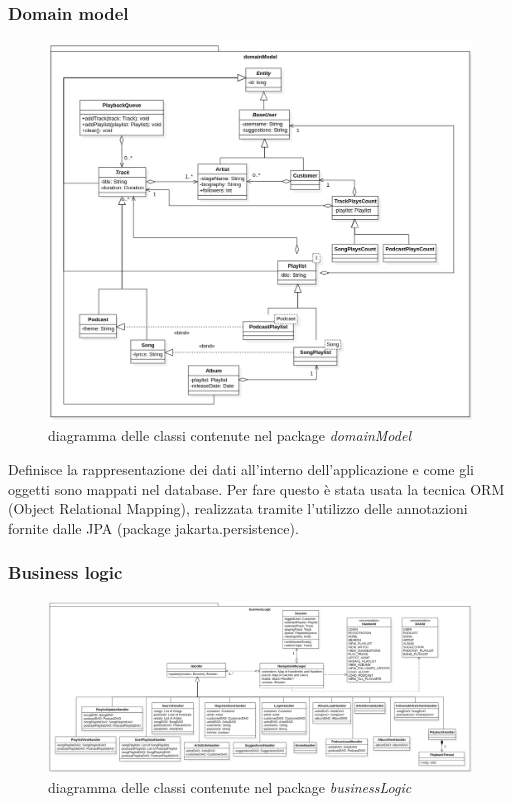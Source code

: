 \documentclass{article}
\begin{document}
  \subsubsection{Domain model}
  \begin{figure}[H]
    \centering
    \includegraphics[width=0.9\linewidth]{domainModel.png}
    \caption{diagramma delle classi contenute nel package \textit{domainModel}}
    \label{fig:domainModel}
  \end{figure}

  Definisce la rappresentazione dei dati all'interno dell'applicazione e come gli oggetti sono mappati nel database. Per fare questo è stata usata la tecnica ORM (Object Relational Mapping), realizzata tramite l'utilizzo delle annotazioni fornite dalle JPA (package jakarta.persistence).

  \subsubsection{Business logic}

  \begin{figure}[H]
    \centering
    \includegraphics[width=1\linewidth]{businessLogic.png}
    \caption{diagramma delle classi contenute nel package \textit{businessLogic}}
    \label{fig:businessLogic}
  \end{figure}
\end{document}
